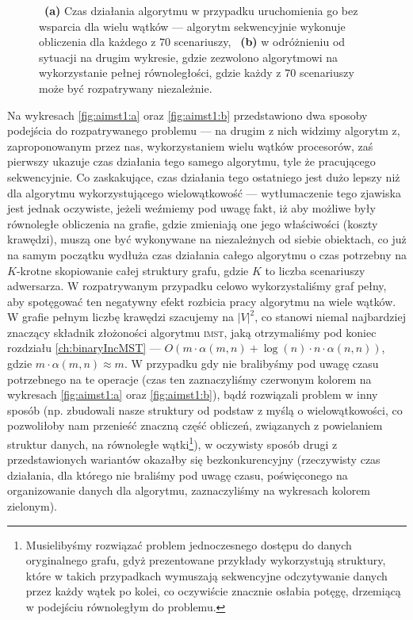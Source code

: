 \begin{figure}[!htbp]
{		~\textbf{(a)} Czas działania algorytmu w przypadku uruchomienia go bez wsparcia dla wielu wątków --- algorytm sekwencyjnie wykonuje obliczenia dla każdego z $70$ scenariuszy,
		~\textbf{(b)} w odróżnieniu od sytuacji na drugim wykresie, gdzie zezwolono algorytmowi na wykorzystanie pełnej równoległości, gdzie każdy z $70$ scenariuszy może być rozpatrywany niezależnie.
	}
	\label{fig:aimst1}
\end{figure}

Na wykresach \ref{fig:aimst1:a} oraz \ref{fig:aimst1:b} przedstawiono dwa sposoby podejścia do rozpatrywanego problemu --- na drugim z nich widzimy algorytm z, zaproponowanym przez nas, wykorzystaniem wielu wątków procesorów, zaś pierwszy ukazuje czas działania tego samego algorytmu, tyle że pracującego sekwencyjnie. Co zaskakujące, czas działania tego ostatniego jest dużo lepszy niż dla algorytmu wykorzystującego wielowątkowość --- wytłumaczenie tego zjawiska jest jednak oczywiste, jeżeli weźmiemy pod uwagę fakt, iż aby możliwe były równoległe obliczenia na grafie, gdzie zmieniają one jego właściwości (koszty krawędzi), muszą one być wykonywane na niezależnych od siebie obiektach, co już na samym początku wydłuża czas działania całego algorytmu o czas potrzebny na $K$-krotne skopiowanie całej struktury grafu, gdzie $K$ to liczba scenariuszy adwersarza. W rozpatrywanym przypadku celowo wykorzystaliśmy graf pełny, aby spotęgować ten negatywny efekt rozbicia pracy algorytmu na wiele wątków. W grafie pełnym liczbę krawędzi szacujemy na $\left| V \right|^{2}$, co stanowi niemal najbardziej znaczący składnik złożoności algorytmu \textsc{imst}, jaką otrzymaliśmy pod koniec rozdziału \ref{ch:binaryIncMST} --- $O \left( m \cdot \alpha  \left( m, n \right) + \log \left( n \right) \cdot n \cdot \alpha \left( n, n \right) \right)$, gdzie $m \cdot \alpha  \left( m, n \right) \approx m$. W przypadku gdy nie bralibyśmy pod uwagę czasu potrzebnego na te operacje (czas ten zaznaczyliśmy czerwonym kolorem na wykresach \ref{fig:aimst1:a} oraz \ref{fig:aimst1:b}), bądź rozwiązali problem w inny sposób (np. zbudowali nasze struktury od podstaw z myślą o wielowątkowości, co pozwoliłoby nam przenieść znaczną część obliczeń, związanych z powielaniem struktur danych, na równoległe wątki\footnote{Musielibyśmy rozwiązać problem jednoczesnego dostępu do danych oryginalnego grafu, gdyż prezentowane przykłady wykorzystują struktury, które w takich przypadkach wymuszają sekwencyjne odczytywanie danych przez każdy wątek po kolei, co oczywiście znacznie osłabia potęgę, drzemiącą w podejściu równoległym do problemu.}), w oczywisty sposób drugi z przedstawionych wariantów okazałby się bezkonkurencyjny (rzeczywisty czas działania, dla którego nie braliśmy pod uwagę czasu, poświęconego na organizowanie danych dla algorytmu, zaznaczyliśmy na wykresach kolorem zielonym).

